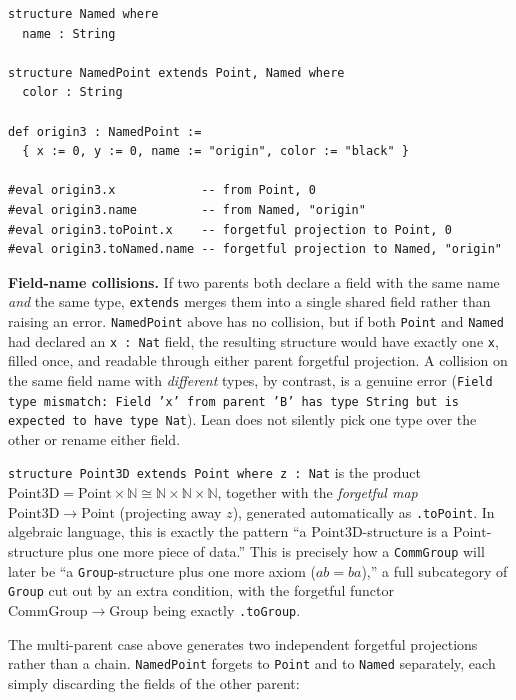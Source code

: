 \begin{lstlisting}
structure Named where
  name : String

structure NamedPoint extends Point, Named where
  color : String

def origin3 : NamedPoint :=
  { x := 0, y := 0, name := "origin", color := "black" }

#eval origin3.x            -- from Point, 0
#eval origin3.name         -- from Named, "origin"
#eval origin3.toPoint.x    -- forgetful projection to Point, 0
#eval origin3.toNamed.name -- forgetful projection to Named, "origin"
\end{lstlisting}

\textbf{Field-name collisions.} If two parents both declare a field with the same name \emph{and} the same type, \texttt{extends} merges them into a single shared field rather than raising an error. \texttt{NamedPoint} above has no collision, but if both \texttt{Point} and \texttt{Named} had declared an \texttt{x : Nat} field, the resulting structure would have exactly one \texttt{x}, filled once, and readable through either parent forgetful projection. A collision on the same field name with \emph{different} types, by contrast, is a genuine error (\texttt{Field type mismatch: Field 'x' from parent 'B' has type String but is expected to have type Nat}). Lean does not silently pick one type over the other or rename either field.

\begin{mathreading}

\texttt{structure Point3D extends Point where z : Nat} is the product \(\mathrm{Point3D} = \mathrm{Point} \times \mathbb{N} \cong \mathbb{N} \times \mathbb{N} \times \mathbb{N}\), together with the \emph{forgetful map} \(\mathrm{Point3D} \to \mathrm{Point}\) (projecting away \(z\)), generated automatically as \texttt{.toPoint}. In algebraic language, this is exactly the pattern ``a \(\mathrm{Point3D}\)-structure is a \(\mathrm{Point}\)-structure plus one more piece of data.'' This is precisely how a \texttt{CommGroup} will later be ``a \texttt{Group}-structure plus one more axiom (\(ab = ba\)),'' a full subcategory of \texttt{Group} cut out by an extra condition, with the forgetful functor \(\mathrm{CommGroup} \to \mathrm{Group}\) being exactly \texttt{.toGroup}.

\end{mathreading}

The multi-parent case above generates two independent forgetful projections rather than a chain. \texttt{NamedPoint} forgets to \texttt{Point} and to \texttt{Named} separately, each simply discarding the fields of the other parent:

